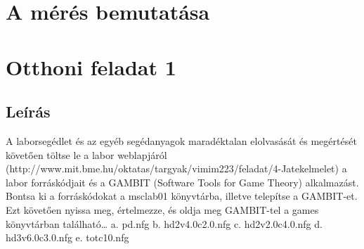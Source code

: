 
\section{A mérés bemutatása}


\section{Otthoni feladat 1}
\subsection{Leírás}
A laborsegédlet és az egyéb segédanyagok maradéktalan elolvasását és megértését követően töltse le a labor weblapjáról (http://www.mit.bme.hu/oktatas/targyak/vimim223/feladat/4-Jatekelmelet) a labor forráskódjait és a GAMBIT (Software Tools for Game Theory) alkalmazást. Bontsa ki a forráskódokat a msclab01 könyvtárba, illetve telepítse a GAMBIT-et. Ezt követően nyissa meg, értelmezze, és oldja meg GAMBIT-tel a games könyvtárban található… 
a. pd.nfg
b. hd2v4.0c2.0.nfg
c. hd2v2.0c4.0.nfg
d. hd3v6.0c3.0.nfg
e. totc10.nfg


